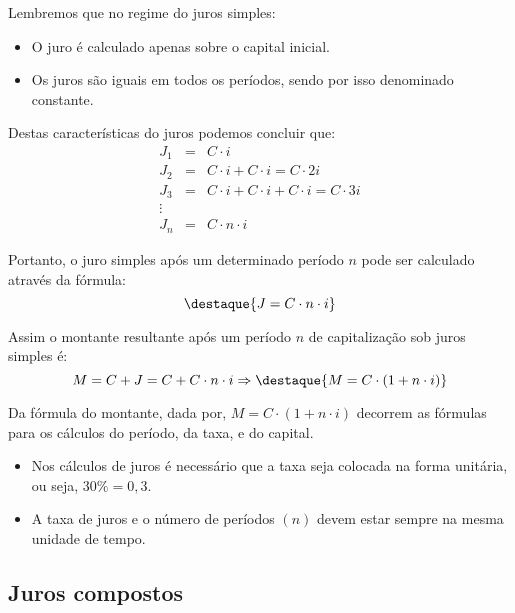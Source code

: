 Lembremos que no regime do juros simples:
 \begin{itemize}
  \item O juro é calculado apenas sobre o capital inicial.
  \item Os juros são iguais em todos os períodos, sendo por isso denominado constante.
 \end{itemize}

 Destas características do juros podemos concluir que:
  \begin{eqnarray*}
  J_1&=& C\cdot i \\
  J_2&=& C\cdot i + C\cdot i= C\cdot 2i \\
  J_3&=& C\cdot i + C\cdot i + C\cdot i= C\cdot 3i \\
  \vdots \\
  J_n&=& C \cdot n \cdot i
  \end{eqnarray*}

 Portanto, o juro simples após um determinado período $n$ pode ser calculado através da fórmula:
  \[\destaque{J= C \cdot n \cdot i}\]

 Assim o montante resultante após um período $n$ de capitalização sob juros simples é:
 \[M= C + J = C + C \cdot n \cdot i \Rightarrow \destaque{M=  C \cdot (1 + n \cdot i)}\]

 Da fórmula do montante, dada por, $M= C \cdot (1 + n \cdot i)$ decorrem as fórmulas para os cálculos do período, da taxa, e do capital.
 \begin{obs}
 \begin{itemize}
  \item Nos cálculos de juros é necessário que a taxa seja colocada na forma unitária, ou seja, $30 \%= 0,3$.
  \item A taxa de juros e o número de períodos $(n)$ devem estar sempre na mesma unidade de tempo.
 \end{itemize}
 \end{obs}



 \subsection{Juros compostos}

